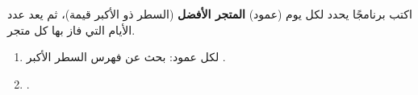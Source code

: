 \begin{statement}
اكتب برنامجًا يحدد لكل يوم (عمود) \textbf{المتجر الأفضل} (السطر ذو الأكبر قيمة)، ثم يعد عدد الأيام التي فاز بها كل متجر.
\end{statement}
\begin{stepsbox}\begin{enumerate}
\item لكل عمود: بحث عن فهرس السطر الأكبر .
\item {}.
\end{enumerate}\end{stepsbox}
